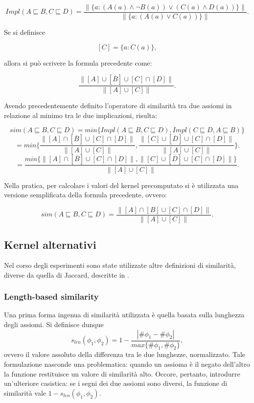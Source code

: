 \documentclass[12pt,a4paper]{report}
\begin{document}
\[Impl(A \sqsubseteq B, C \sqsubseteq D) = \frac{\parallel \{ a: (A(a) \land \lnot B(a)) \lor (C(a) \land D(a)) \} \parallel}{\parallel \{ a: (A(a) \lor C(a))\} \parallel}. \]

Se si definisce

\[ [C] = \{a : C(a) \},\]

allora si può scrivere la formula precedente come:

\[ \frac{\parallel [A] \cup [\overline{B}] \cup [C] \cap [D] \parallel}{\parallel [A] \cup [C] \parallel}.\]

Avendo precedentemente definito l'operatore di similarità tra due assiomi in relazione al minimo tra le due implicazioni, risulta:

\[ sim(A \sqsubseteq B, C  \sqsubseteq D) = min\{Impl(A \sqsubseteq B, C\sqsubseteq D), Impl( C\sqsubseteq D, A \sqsubseteq B)\} \]
\[ = min\bigg\{\frac{\parallel [A] \cap [\overline{B}] \cup [C] \cap [D] \parallel}{\parallel [A] \cup [C] \parallel}, \frac{\parallel [C] \cup [\overline{D}] \cup [C] \cap [D] \parallel}{\parallel [A] \cup [C] \parallel}\bigg\}.\]
\[ = \frac{min\{\parallel [A] \cap [\overline{B}] \cup [C] \cap [D] \parallel, \parallel [C] \cup [\overline{D}] \cup [C] \cap [D] \parallel\}}{\parallel [A] \cup [C] \parallel}.\]

Nella pratica, per calcolare i valori del kernel precomputato si è utilizzata una versione semplificata della formula precedente, ovvero:

\[sim(A \sqsubseteq B, C  \sqsubseteq D) = \frac{\parallel [A] \cap [B] \cup [C] \cap [D] \parallel}{\parallel [A] \cup [C] \parallel}. \]


\subsection{Kernel alternativi}
Nel corso degli esperimenti sono state utilizzate altre definizioni di similarità, diverse da quella di Jaccard, descritte in \cite{drtpaper}.
\subsubsection{Length-based similarity}
\label{lengthSection}
Una prima forma ingenua di similarità utilizzata è quella basata sulla lunghezza degli assiomi.
Si definisce dunque
\[ s_{len}(\phi_1, \phi_2) = 1 - \frac{|\# \phi_1 - \# \phi_2|}{max\{\#\phi_1, \#\phi_2\}},\]
ovvero il valore assoluto della differenza tra le due lunghezze, normalizzato.
Tale formulazione nasconde una problematica: quando un assioma è il negato dell'altro la funzione restituisce un valore di similarità alto. Occore, pertanto, introdurre un'ulteriore casistica: se i segni dei due assiomi sono diversi, la funzione di similarità vale $1 - s_{len}(\phi_1,\phi_2)$.
\end{document}
